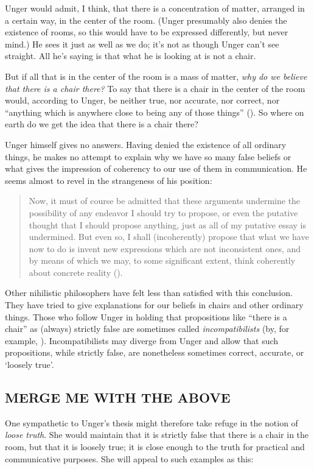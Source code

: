 \documentclass[11pt]{standalone} \newif\ifstandlone \standalonetrue
\newenvironment{squote}{%
	\begin{quote}\begin{singlespace}%
	}{%
	\end{singlespace}\end{quote}}
\begin{document}
\begin{spacing}{1.5}
Unger would admit, I think, that there is a concentration of matter,
arranged in a certain way, in the center of the room.  (Unger
presumably also denies the existence of rooms, so this would have to
be expressed differently, but never mind.)  He sees it just as well
as we do; it's not as though Unger can't see straight.  All he's
saying is that what he is looking at is not a chair.

But if all that is in the center of the room is a mass of matter, {\em
  why do we believe that there is a chair there?}  To say that there
is a chair in the center of the room would, according to Unger, be
neither true, nor accurate, nor correct, nor ``anything which is
anywhere close to being any of those things''
(\citeyear[148]{unger1979}).  So where on earth do we get the idea
that there is a chair there?

Unger himself gives no answers.  Having denied the existence of all
ordinary things, he makes no attempt to explain why we have so many
false beliefs or what gives the impression of coherency to our use of
them in communication.  He seems almost to revel in the strangeness of
his position:

\begin{squote}
Now, it must of course be admitted that these arguments
undermine the possibility of any endeavor I should try to propose, or
even the putative thought that I should propose anything, just as all
of my putative essay is undermined.  But even so, I shall
(incoherently) propose that what we have now to do is invent new
expressions which are not inconsistent ones, and by means of which we
may, to some significant extent, think coherently about concrete
reality (\citeyear[544]{unger1980b}).
\end{squote}
Other nihilistic philosophers have felt less than satisfied with this
conclusion.  They have tried to give explanations for our beliefs in
chairs and other ordinary things.  Those who follow Unger in holding
that propositions like ``there is a chair'' as (always) strictly false
are sometimes called {\em incompatibilists} (by, for example,
\citet{korman2009}).  Incompatibilists may diverge from Unger and
allow that such propositions, while strictly false, are nonetheless
sometimes correct, accurate, or `loosely true'.

\subsection{MERGE ME WITH THE ABOVE}
\label{loose-u}
One sympathetic to Unger's thesis might therefore take refuge in the
notion of {\em loose truth}.  She would maintain that it is strictly
false that there is a chair in the room, but that it is loosely true;
it is close enough to the truth for practical and communicative
purposes.  She will appeal to such examples as this:


\end{spacing}
\end{document}

